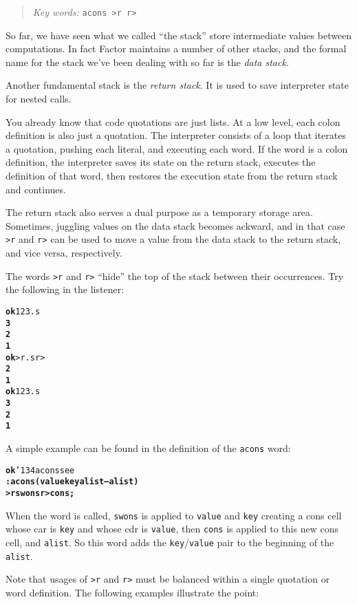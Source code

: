 \documentclass[english]{book}
\newcommand{\ttbackslash}{\char'134}
\newcommand{\chapkeywords}[1]{%
\begin{quote}
\emph{Key words:} \texttt{#1}
\end{quote}
}
\begin{document}
\chapkeywords{acons >r r>}

So far, we have seen what we called ``the stack'' store intermediate values between computations. In fact Factor maintains a number of other stacks, and the formal name for the stack we've been dealing with so far is the \emph{data stack}.

Another fundamental stack is the \emph{return stack}. It is used to save interpreter state for nested calls.

You already know that code quotations are just lists. At a low level, each colon definition is also just a quotation. The interpreter consists of a loop that iterates a quotation, pushing each literal, and executing each word. If the word is a colon definition, the interpreter saves its state on the return stack, executes the definition of that word, then restores the execution state from the return stack and continues.

The return stack also serves a dual purpose as a temporary storage area. Sometimes, juggling values on the data stack becomes ackward, and in that case \texttt{>r} and \texttt{r>} can be used to move a value from the data stack to the return stack, and vice versa, respectively.

The words \texttt{>r} and \texttt{r>} ``hide'' the top of the stack between their occurrences. Try the following in the listener:

\begin{alltt}
\textbf{ok} 1 2 3 .s
\textbf{3
2
1}
\textbf{ok} >r .s r>
\textbf{2
1}
\textbf{ok} 1 2 3 .s
\textbf{3
2
1}
\end{alltt}

A simple example can be found in the definition of the \texttt{acons} word:

\begin{alltt}
\textbf{ok} \ttbackslash acons see
\textbf{: acons ( value key alist -- alist )
    >r swons r> cons ;}
\end{alltt}

When the word is called, \texttt{swons} is applied to \texttt{value} and \texttt{key} creating a cons cell whose car is \texttt{key} and whose cdr is \texttt{value}, then \texttt{cons} is applied to this new cons cell, and \texttt{alist}. So this word adds the \texttt{key}/\texttt{value} pair to the beginning of the \texttt{alist}.

Note that usages of \texttt{>r} and \texttt{r>} must be balanced within a single quotation or word definition. The following examples illustrate the point:
\end{document}
